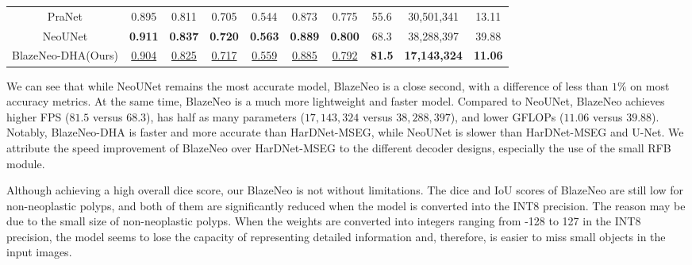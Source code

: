 \documentclass{ieeeaccess}
\newcommand{\ModelName}{BlazeNeo\xspace}
\newcommand{\DHA}{BlazeNeo-DHA\xspace}
\begin{document}
\begin{table*}[ht!]
\begin{tabular}{@{} c | c c c c c c | c c c@{}}
        PraNet \cite{fan2020pranet}          & 0.895                                   & 0.811                                  & 0.705                                   & 0.544                                  & 0.873                                   & 0.775                                     & 55.6                    & 30,501,341                     & 13.11                      \\
        NeoUNet \cite{lan2021neounet}        & \textbf{0.911}                          & \textbf{0.837}                         & \textbf{0.720}                          & \textbf{0.563}                         & \textbf{0.889}                          & \textbf{0.800}                            & 68.3                    & 38,288,397                     & 39.88                      \\
        \DHA (Ours)                          & \underline{0.904}                       & \underline{0.825}                      & \underline{0.717}                       & \underline{0.559}                      & \underline{0.885}                       & \underline{0.792}                         & \textbf{81.5}           & \textbf{17,143,324}            & \textbf{11.06}             \\
        
        \bottomrule
    \end{tabular}
\end{table*}

We can see that while NeoUNet remains the most accurate model, \ModelName is a close second, with a difference of less than $1\%$ on most accuracy metrics. At the same time, \ModelName is a much more lightweight and faster model. Compared to NeoUNet, \ModelName achieves higher FPS ($81.5$ versus $68.3$), has half as many parameters ($17,143,324$ versus $38,288,397$), and lower GFLOPs ($11.06$ versus $39.88$). Notably, \DHA is faster and more accurate than HarDNet-MSEG, while NeoUNet is slower than HarDNet-MSEG and U-Net. We attribute the speed improvement of \ModelName over HarDNet-MSEG to the different decoder designs, especially the use of the small RFB module.

Although achieving a high overall dice score, our \ModelName is not without limitations. The dice and IoU scores of \ModelName are still low for non-neoplastic polyps, and both of them are significantly reduced when the model is converted into the INT8 precision. The reason may be due to the small size of non-neoplastic polyps. When the weights are converted into integers ranging from -128 to 127 in the INT8 precision, the model seems to lose the capacity of representing detailed information and, therefore, is easier to miss small objects in the input images. 
\end{document}
